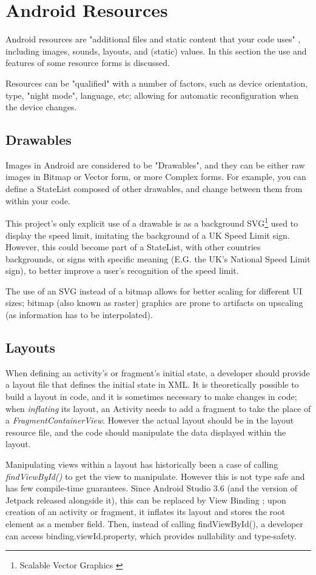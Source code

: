 \documentclass[11pt, a4paper, notitlepage]{report}
\begin{document}
\section{Android Resources}
Android resources are "additional files and static content that your code uses" \citep{resourcesAndroid}, including images, sounds, layouts, and (static) values. In this section the use and features of some resource forms is discussed.

Resources can be "qualified" with a number of factors, such as device orientation, type, "night mode", language, etc; allowing for automatic reconfiguration when the device changes.

\subsection{Drawables}
Images in Android are considered to be "Drawables", and they can be either raw images in Bitmap or Vector form, or more Complex forms. For example, you can define a StateList composed of other drawables, and change between them from within your code.

This project's only explicit use of a drawable is as a background SVG\footnote{Scalable Vector Graphics \citep{SVGW3C}} used to display the speed limit, imitating the background of a UK Speed Limit sign. However, this could become part of a StateList, with other countries backgrounds, or signs with specific meaning (E.G. the UK's National Speed Limit sign), to better improve a user's recognition of the speed limit.

The use of an SVG instead of a bitmap allows for better scaling for different UI sizes; bitmap (also known as raster) graphics are prone to artifacts on upscaling (as information has to be interpolated).

\subsection{Layouts}
When defining an activity's or fragment's initial state, a developer should provide a layout file that defines the initial state in XML. It is theoretically possible to build a layout in code, and it is sometimes necessary to make changes in code; when \textit{inflating} its layout, an Activity needs to add a fragment to take the place of a \textit{FragmentContainerView}. However the actual layout should be in the layout resource file, and the code should manipulate the data displayed within the layout.

Manipulating views within a layout has historically been a case of calling \textit{findViewById()} to get the view to manipulate. However this is not type safe and has few compile-time guarantees. Since Android Studio 3.6 (and the version of Jetpack released alongside it), this can be replaced by View Binding \citep{viewBindingAndroid}; upon creation of an activity or fragment, it inflates its layout and stores the root element as a member field. Then, instead of calling findViewById(), a developer can access binding.viewId.property, which provides nullability and type-safety.
\end{document}
